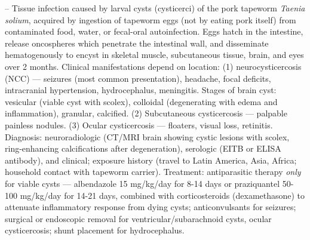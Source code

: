 -- Tissue infection caused by larval cysts (cysticerci) of the pork tapeworm \emph{Taenia solium}, acquired by ingestion of tapeworm eggs (not by eating pork itself) from contaminated food, water, or fecal-oral autoinfection. Eggs hatch in the intestine, release oncospheres which penetrate the intestinal wall, and disseminate hematogenously to encyst in skeletal muscle, subcutaneous tissue, brain, and eyes over 2 months. Clinical manifestations depend on location: (1) neurocysticercosis (NCC) — seizures (most common presentation), headache, focal deficits, intracranial hypertension, hydrocephalus, meningitis. Stages of brain cyst: vesicular (viable cyst with scolex), colloidal (degenerating with edema and inflammation), granular, calcified. (2) Subcutaneous cysticercosis — palpable painless nodules. (3) Ocular cysticercosis — floaters, visual loss, retinitis. Diagnosis: neuroradiologic (CT/MRI brain showing cystic lesions with scolex, ring-enhancing calcifications after degeneration), serologic (EITB or ELISA antibody), and clinical; exposure history (travel to Latin America, Asia, Africa; household contact with tapeworm carrier). Treatment: antiparasitic therapy \emph{only} for viable cysts — albendazole 15 mg/kg/day for 8-14 days or praziquantel 50-100 mg/kg/day for 14-21 days, combined with corticosteroids (dexamethasone) to attenuate inflammatory response from dying cysts; anticonvulsants for seizures; surgical or endoscopic removal for ventricular/subarachnoid cysts, ocular cysticercosis; shunt placement for hydrocephalus.


